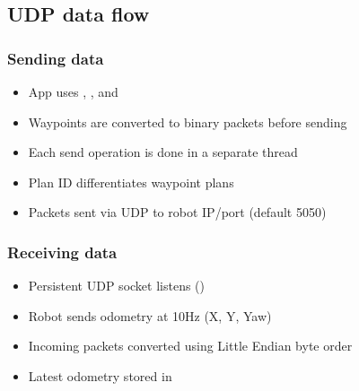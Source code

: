 \documentclass[letterpaper,10pt,english]{sphinxmanual}
\begin{document}
\subsection{UDP data flow}
\label{\detokenize{technical_reference:udp-data-flow}}

\subsubsection{Sending data}
\label{\detokenize{technical_reference:sending-data}}\begin{itemize}
\item {} 
\sphinxAtStartPar
App uses , , and 

\item {} 
\sphinxAtStartPar
Waypoints are converted to binary packets before sending

\item {} 
\sphinxAtStartPar
Each send operation is done in a separate thread

\item {} 
\sphinxAtStartPar
Plan ID differentiates waypoint plans

\item {} 
\sphinxAtStartPar
Packets sent via UDP to robot IP/port (default 5050)

\end{itemize}


\subsubsection{Receiving data}
\label{\detokenize{technical_reference:receiving-data}}\begin{itemize}
\item {} 
\sphinxAtStartPar
Persistent UDP socket listens ()

\item {} 
\sphinxAtStartPar
Robot sends odometry at 10Hz (X, Y, Yaw)

\item {} 
\sphinxAtStartPar
Incoming packets converted using Little Endian byte order

\item {} 
\sphinxAtStartPar
Latest odometry stored in 

\end{itemize}
\end{document}
